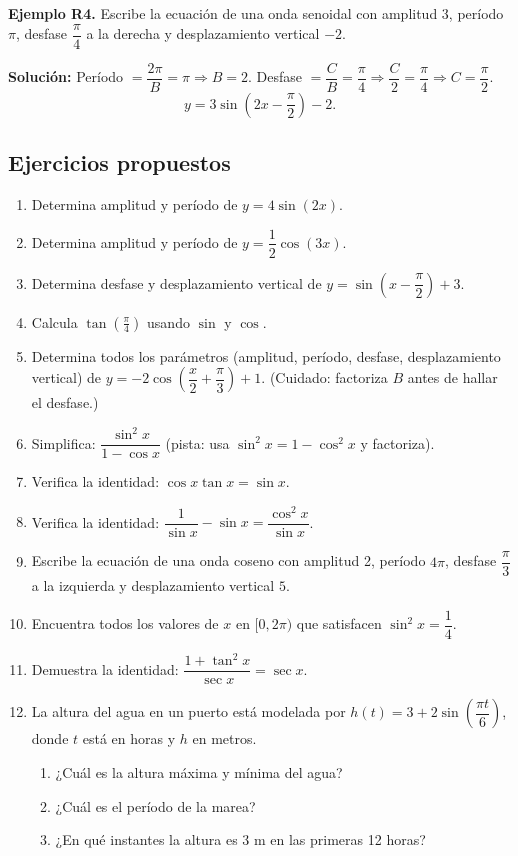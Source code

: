 \documentclass[12pt, letterpaper]{article}
\begin{document}
\textbf{Ejemplo R4.} Escribe la ecuación de una onda senoidal con amplitud 3, período $\pi$, desfase $\dfrac{\pi}{4}$ a la derecha y desplazamiento vertical $-2$.

\begin{cuadrosolucion}
  \textbf{Solución:} Período $= \dfrac{2\pi}{B} = \pi \Rightarrow B = 2$. Desfase $= \dfrac{C}{B} = \dfrac{\pi}{4} \Rightarrow \dfrac{C}{2} = \dfrac{\pi}{4} \Rightarrow C = \dfrac{\pi}{2}$.
  $$y = 3\sin\left(2x - \frac{\pi}{2}\right) - 2.$$
\end{cuadrosolucion}

\subsection{Ejercicios propuestos}

\begin{enumerate}[resume=ejercicios, leftmargin=*]
  \item \facil{} Determina amplitud y período de $y = 4\sin(2x)$.
  \item \facil{} Determina amplitud y período de $y = \dfrac{1}{2}\cos(3x)$.
  \item \facil{} Determina desfase y desplazamiento vertical de $y = \sin\left(x - \dfrac{\pi}{2}\right) + 3$.
  \item \facil{} Calcula $\tan\left(\frac{\pi}{4}\right)$ usando $\sin$ y $\cos$.
  \item \medio{} Determina todos los parámetros (amplitud, período, desfase, desplazamiento vertical) de $y = -2\cos\left(\dfrac{x}{2} + \dfrac{\pi}{3}\right) + 1$. (Cuidado: factoriza $B$ antes de hallar el desfase.)
  \item \medio{} Simplifica: $\dfrac{\sin^2 x}{1 - \cos x}$ (pista: usa $\sin^2 x = 1 - \cos^2 x$ y factoriza).
  \item \medio{} Verifica la identidad: $\cos x \tan x = \sin x$.
  \item \medio{} Verifica la identidad: $\dfrac{1}{\sin x} - \sin x = \dfrac{\cos^2 x}{\sin x}$.
  \item \dificil{} Escribe la ecuación de una onda coseno con amplitud 2, período $4\pi$, desfase $\dfrac{\pi}{3}$ a la izquierda y desplazamiento vertical $5$.
  \item \dificil{} Encuentra todos los valores de $x$ en $[0, 2\pi)$ que satisfacen $\sin^2 x = \dfrac{1}{4}$.
  \item \dificil{} Demuestra la identidad: $\dfrac{1 + \tan^2 x}{\sec x} = \sec x$.
  \item \dificil{} La altura del agua en un puerto está modelada por $h(t) = 3 + 2\sin\left(\dfrac{\pi t}{6}\right)$, donde $t$ está en horas y $h$ en metros.
        \begin{enumerate}[label=\alph*)]
          \item ¿Cuál es la altura máxima y mínima del agua?
          \item ¿Cuál es el período de la marea?
          \item ¿En qué instantes la altura es $3$ m en las primeras 12 horas?
        \end{enumerate}
\end{enumerate}
\end{document}

